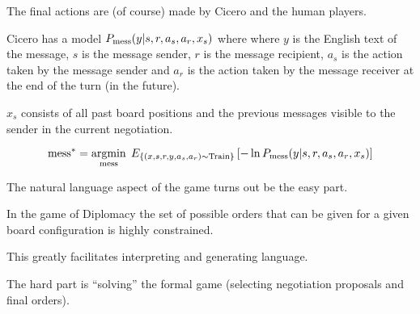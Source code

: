 {\vfill
The final actions are (of course) made by Cicero and the human players.


Cicero has a model $P_{\mathrm{mess}}(y|s,r,a_s,a_r,x_s)$ where
where $y$ is the English text of the message, $s$ is the message sender, $r$ is the message recipient,
$a_s$ is the action taken by the message sender and $a_r$ is the action
taken by the message receiver at the end of the turn (in the future).

\vfill
$x_s$ consists of all past board positions and the previous messages visible to the sender in the current negotiation.



{\huge
$$\mathrm{mess}^* = \operatorname*{argmin}_{\mathrm{mess}}\;E_{\{(x,s,r,y,a_s,a_r) \sim \mathrm{Train}\}} \left[-\ln P_{\mathrm{mess}}(y|s,r,a_s,a_r,x_s)\right]$$
}


The natural language aspect of the game turns out be the easy part.

\vfill
In the game of Diplomacy the set of possible orders that can be given for a given board configuration is highly constrained.

\vfill
This greatly facilitates interpreting and generating language.

\vfill
The hard part is ``solving'' the formal game (selecting negotiation proposals and final orders).


}

